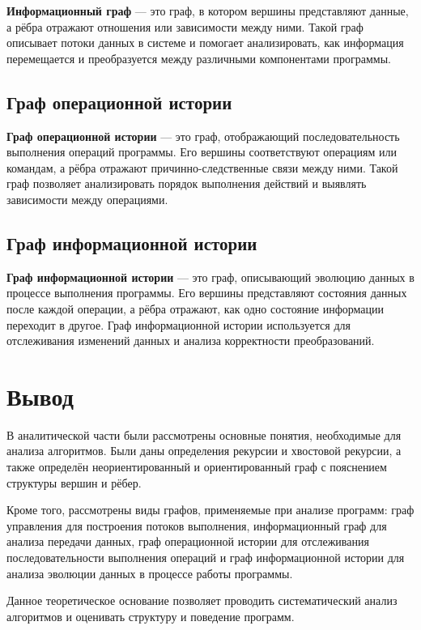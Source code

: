 \textbf{Информационный граф} --- это граф, в котором вершины представляют данные, а рёбра отражают отношения или зависимости между ними.  
Такой граф описывает потоки данных в системе и помогает анализировать, как информация перемещается и преобразуется между различными компонентами программы.

\subsection{Граф операционной истории}

\textbf{Граф операционной истории} --- это граф, отображающий последовательность выполнения операций программы.  
Его вершины соответствуют операциям или командам, а рёбра отражают причинно-следственные связи между ними.  
Такой граф позволяет анализировать порядок выполнения действий и выявлять зависимости между операциями.

\subsection{Граф информационной истории}

\textbf{Граф информационной истории} --- это граф, описывающий эволюцию данных в процессе выполнения программы.  
Его вершины представляют состояния данных после каждой операции, а рёбра отражают, как одно состояние информации переходит в другое.  
Граф информационной истории используется для отслеживания изменений данных и анализа корректности преобразований.


\section*{Вывод}

В аналитической части были рассмотрены основные понятия, необходимые для анализа алгоритмов.  
Были даны определения рекурсии и хвостовой рекурсии, а также определён неориентированный и ориентированный граф с пояснением структуры вершин и рёбер.  

Кроме того, рассмотрены виды графов, применяемые при анализе программ:  
граф управления для построения потоков выполнения, информационный граф для анализа передачи данных, граф операционной истории для отслеживания последовательности выполнения операций и граф информационной истории для анализа эволюции данных в процессе работы программы.  

Данное теоретическое основание позволяет проводить систематический анализ алгоритмов и оценивать структуру и поведение программ.

